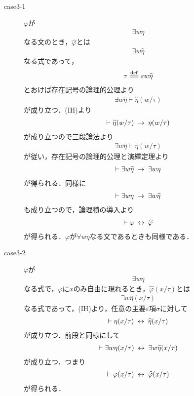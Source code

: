 \begin{sketch}
\begin{description}
\begin{description}
				\item[case3-1] $\varphi$が
					\begin{align}
						\exists w \eta
					\end{align}
					なる文のとき，$\widehat{\varphi}$とは
					\begin{align}
						\exists w \widehat{\eta}
					\end{align}
					なる式であって，
					\begin{align}
						\tau \defeq \varepsilon w \widehat{\eta}
					\end{align}
					とおけば存在記号の論理的公理より
					\begin{align}
						\exists w \widehat{\eta} \vdash \widehat{\eta}(w/\tau)
					\end{align}
					が成り立つ．(IH)より
					\begin{align}
						\vdash \widehat{\eta}(w/\tau) \hspace{0.25em}\rightarrow\hspace{0.25em} \eta(w/\tau)
					\end{align}
					が成り立つので三段論法より
					\begin{align}
						\exists w \widehat{\eta} \vdash \eta(w/\tau)
					\end{align}
					が従い，存在記号の論理的公理と演繹定理より
					\begin{align}
						\vdash \exists w \widehat{\eta} \hspace{0.25em}\rightarrow\hspace{0.25em} \exists w \eta
					\end{align}
					が得られる．同様に
					\begin{align}
						\vdash \exists w \eta \hspace{0.25em}\rightarrow\hspace{0.25em} \exists w \widehat{\eta}
					\end{align}
					も成り立つので，論理積の導入より
					\begin{align}
						\vdash \varphi \hspace{0.25em}\leftrightarrow\hspace{0.25em} \widehat{\varphi}
					\end{align}
					が得られる．$\varphi$が$\forall w \eta$なる文であるときも同様である．
					
				\item[case3-2] $\varphi$が
					\begin{align}
						\exists w \eta
					\end{align}
					なる式で，$\varphi$に$x$のみ自由に現れるとき，$\widehat{\varphi}(x/\tau)$とは
					\begin{align}
						\exists w \widehat{\eta}(x/\tau)
					\end{align}
					なる式であって，(IH)より，任意の主要$\varepsilon$項$\sigma$に対して
					\begin{align}
						\vdash \eta(x/\tau) \hspace{0.25em}\leftrightarrow\hspace{0.25em} \widehat{\eta}(x/\tau)
					\end{align}
					が成り立つ．前段と同様にして
					\begin{align}
						\vdash \exists w \eta(x/\tau) \hspace{0.25em}\leftrightarrow\hspace{0.25em} \exists w \widehat{\eta}(x/\tau)
					\end{align}
					が成り立つ．つまり
					\begin{align}
						\vdash \varphi(x/\tau) \hspace{0.25em}\leftrightarrow\hspace{0.25em} \widehat{\varphi}(x/\tau)
					\end{align}
					が得られる．
					

\end{description}
\end{description}
\end{sketch}
